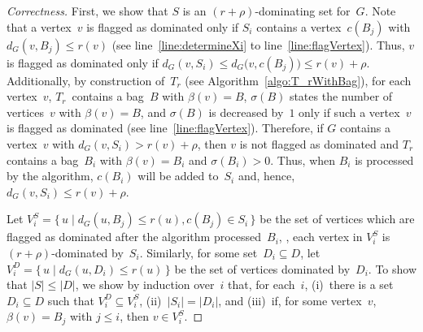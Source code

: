 \begin{proof}
    [Correctness]
First, we show that $S$ is an $(r + \rho)$-dominating set for~$G$.
Note that a vertex~$v$ is flagged as dominated only if $S_i$ contains a vertex~$c(B_j)$ with $d_G(v, B_j) \leq r(v)$ (see line~\ref{line:determineXi} to line~\ref{line:flagVertex}).
Thus, $v$ is flagged as dominated only if $d_G(v, S_i) \leq d_G \big(v, c(B_j) \big) \leq r(v) + \rho$.
Additionally, by construction of~$T_r$ (see Algorithm~\ref{algo:T_rWithBag}), for each vertex~$v$, $T_r$~contains a bag~$B$ with $\beta(v) = B$, $\sigma(B)$ states the number of vertices~$v$ with $\beta(v) = B$, and $\sigma(B)$ is decreased by~$1$ only if such a vertex~$v$ is flagged as dominated (see line~\ref{line:flagVertex}).
Therefore, if $G$ contains a vertex~$v$ with $d_G(v, S_i) > r(v) + \rho$, then $v$ is not flagged as dominated and $T_r$ contains a bag~$B_i$ with $\beta(v) = B_i$ and $\sigma(B_i) > 0$.
Thus, when $B_i$ is processed by the algorithm, $c(B_i)$ will be added to~$S_i$ and, hence, $d_G(v, S_i) \leq r(v) + \rho$.

Let $V^S_i = \{ \, u \mid d_G(u, B_j) \leq r(u), c(B_j) \in S_i \, \}$ be the set of vertices which are flagged as dominated after the algorithm processed~$B_i$, \ie, each vertex in $V^S_i$ is $(r + \rho)$-dominated by~$S_i$.
Similarly, for some set~$D_i \subseteq D$, let $V^D_i = \{ \, u \mid d_G(u, D_i) \leq r(u) \, \}$ be the set of vertices dominated by~$D_i$.
To show that $|S| \leq |D|$, we show by induction over~$i$ that, for each~$i$, (i)~there is a set~$D_i \subseteq D$ such that $V^D_i \subseteq V^S_i$, (ii)~$|S_i| = |D_i|$, and (iii)~if, for some vertex~$v$, $\beta(v) = B_j$ with $j \leq i$, then $v \in V^S_i$.


\end{proof}
